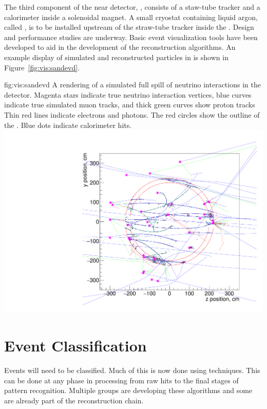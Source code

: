 \documentclass[../main-v1.tex]{subfiles}
\begin{document}
The third component of the near detector, , consists of a staw-tube tracker and a calorimeter inside a solenoidal magnet.  A small cryostat containing liquid argon, called , %
is to be installed upstream of the straw-tube tracker inside the .  Design and performance studies are underway.  Basic event visualization tools have been developed to aid in the development of the reconstruction algorithms.  An example display of simulated and reconstructed particles in  is shown in Figure~\ref{fig:vis:sandevd}.

\begin{dunefigure}
{fig:vis:sandevd} 
{A rendering of a simulated full spill of neutrino interactions in the  detector. Magenta stars indicate true neutrino interaction vertices, blue curves indicate true simulated muon tracks, and thick green curves show proton tracks  Thin red lines indicate electrons and photons.  The red circles show the outline of the .  Blue dots indicate calorimeter hits.}
\includegraphics[width=0.9 \textwidth]{graphics/EventDisplays/sand_detector_view_stt_17924.pdf}
\end{dunefigure}

\section{Event Classification}
Events will need to be classified.  Much of this is now done using  techniques.  This can be done at any phase in processing from raw hits to the final stages of pattern recognition. Multiple groups are developing these algorithms and some are already part of the reconstruction chain.
\end{document}
